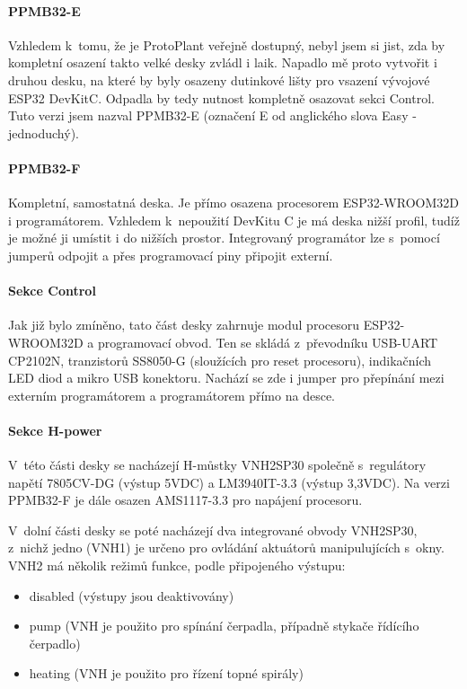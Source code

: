 \paragraph{PPMB32-E}
Vzhledem k~tomu, že je ProtoPlant veřejně dostupný, nebyl jsem si jist, zda by kompletní osazení takto velké desky zvládl i laik. 
Napadlo mě proto vytvořit i druhou desku, na které by byly osazeny dutinkové lišty pro vsazení vývojové ESP32 DevKitC. 
Odpadla by tedy nutnost kompletně osazovat sekci Control. 
Tuto verzi jsem nazval PPMB32-E (označení E od anglického slova Easy - jednoduchý).

\paragraph{PPMB32-F}
Kompletní, samostatná deska. 
Je přímo osazena procesorem ESP32-WROOM32D i programátorem. 
Vzhledem k~nepoužití DevKitu C je má deska nižší profil, tudíž je možné ji umístit i do nižších prostor. 
Integrovaný programátor lze s~pomocí jumperů odpojit a přes programovací piny připojit externí.

\paragraph{Sekce Control}
Jak již bylo zmíněno, tato část desky zahrnuje modul procesoru ESP32-WROOM32D a programovací obvod. 
Ten se skládá z~převodníku USB-UART CP2102N, tranzistorů SS8050-G (sloužících pro reset procesoru), indikačních LED diod a mikro USB konektoru. 
Nachází se zde i jumper pro přepínání mezi externím programátorem a programátorem přímo na desce.

\paragraph{Sekce H-power}
V~této části desky se nacházejí H-můstky VNH2SP30 společně s~regulátory napětí 7805CV-DG (výstup 5VDC) a LM3940IT-3.3 (výstup 3,3VDC). 
Na verzi PPMB32-F je dále osazen AMS1117-3.3 pro napájení procesoru. 

V~dolní části desky se poté nacházejí dva integrované obvody VNH2SP30, z~nichž jedno (VNH1) je určeno pro ovládání aktuátorů manipulujících s~okny.
VNH2 má několik režimů funkce, podle připojeného výstupu:
\begin{itemize}
    \item disabled (výstupy jsou deaktivovány)
    \item pump (VNH je použito pro spínání čerpadla, případně stykače řídícího čerpadlo)
    \item heating (VNH je použito pro řízení topné spirály)
\end{itemize}

